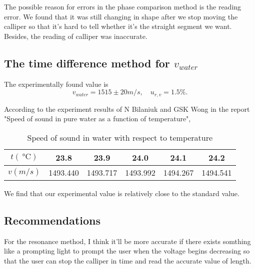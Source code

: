     The possible reason for errors in the phase comparison method is the reading error. We found that it was still changing in shape after we stop moving the calliper so that it's hard to tell whether it's the straight segment we want. Besides, the reading of calliper was inaccurate. 

\subsection{The time difference method for $v_{water}$}
    The experimentally found value is
    \[
        v_{water}=1515\pm20m/s,\quad u_{r,v}=1.5\%.
    \]

    According to the experiment results of N Bilaniuk and GSK Wong in the report "Speed of sound in pure water as a function of temperature", 
    \begin{table}[H]
        \centering
        \begin{tabular}{|c|c|c|c|c|c|}
        \hline
            $t(\SI{}{\degreeCelsius})$ & 23.8 & 23.9 & 24.0 & 24.1 & 24.2\\\hline
            $v(m/s)$ & 1493.440 & 1493.717 & 1493.992 & 1494.267 & 1494.541\\\hline
        \end{tabular}
        \caption{Speed of sound in water with respect to temperature\cite{foo2}}\label{water}
    \end{table}

    We find that our experimental value is relatively close to the standard value.

\subsection{Recommendations}
    For the resonance method, I think it'll be more accurate if there exists somthing like a prompting light to prompt the user when the voltage begins decreasing so that the user can stop the calliper in time and read the accurate value of length.